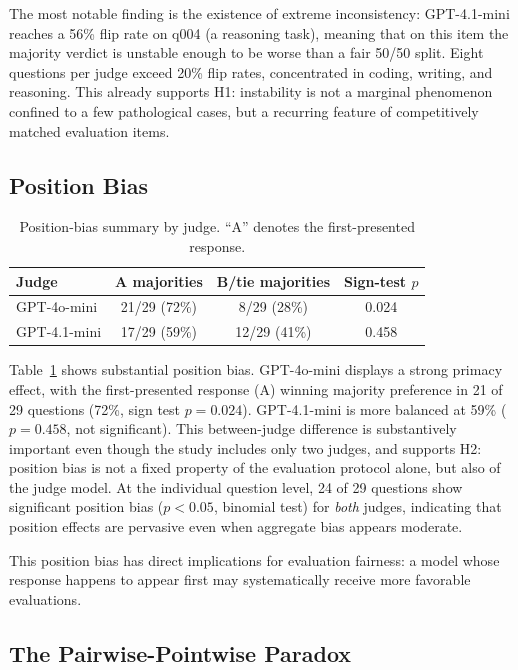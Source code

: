\documentclass{ijclclp}
\begin{document}
The most notable finding is the existence of extreme inconsistency: GPT-4.1-mini reaches a 56\% flip rate on q004 (a reasoning task), meaning that on this item the majority verdict is unstable enough to be worse than a fair 50/50 split. Eight questions per judge exceed 20\% flip rates, concentrated in coding, writing, and reasoning. This already supports H1: instability is not a marginal phenomenon confined to a few pathological cases, but a recurring feature of competitively matched evaluation items.

\subsection{Position Bias}

\begin{table}[ht]
\centering
\caption{Position-bias summary by judge. ``A'' denotes the first-presented response.}
\label{tab:position_bias}
\begin{tabular}{lccc}
\toprule
\textbf{Judge} & \textbf{A majorities} & \textbf{B/tie majorities} & \textbf{Sign-test $p$} \\
\midrule
GPT-4o-mini & 21/29 (72\%) & 8/29 (28\%) & 0.024 \\
GPT-4.1-mini & 17/29 (59\%) & 12/29 (41\%) & 0.458 \\
\bottomrule
\end{tabular}
\end{table}

Table~\ref{tab:position_bias} shows substantial position bias. GPT-4o-mini displays a strong primacy effect, with the first-presented response (A) winning majority preference in 21 of 29 questions (72\%, sign test $p = 0.024$). GPT-4.1-mini is more balanced at 59\% ($p = 0.458$, not significant). This between-judge difference is substantively important even though the study includes only two judges, and supports H2: position bias is not a fixed property of the evaluation protocol alone, but also of the judge model. At the individual question level, 24 of 29 questions show significant position bias ($p < 0.05$, binomial test) for \textit{both} judges, indicating that position effects are pervasive even when aggregate bias appears moderate.

This position bias has direct implications for evaluation fairness: a model whose response happens to appear first may systematically receive more favorable evaluations.

\subsection{The Pairwise-Pointwise Paradox}
\label{sec:results_paradox}
\end{document}
